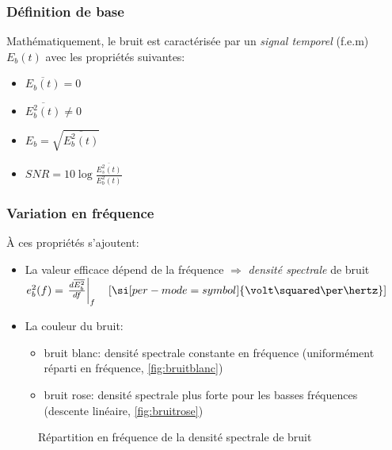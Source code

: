 \subsubsection{Définition de base}
Mathématiquement, le bruit est caractérisée par un \emph{signal temporel} (f.e.m) $E_b(t)$ avec les propriétés suivantes:
\begin{itemize}
	\item { $\overline{E_b(t)}=0$}
	\item { $\overline{E_b^2(t)} \neq 0$}
	\item { $E_b=\sqrt{\overline{E_b^2(t)}}$}
	\item { $SNR=10\log\frac{\overline{E^2_s(t)}}{E_b^2(t)}$}
\end{itemize}
\subsubsection{Variation en fréquence}
À ces propriétés s'ajoutent:\begin{itemize}
	\item La valeur efficace dépend de la fréquence $\Rightarrow$ \emph{densité spectrale} de bruit $e_b^2(f)=\left.\frac{d\overline{E_b^2}}{df}\right|_f\quad [\si[per-mode=symbol]{\volt\squared\per\hertz}]$
	\item La couleur du bruit:
	\begin{itemize}
		\item bruit blanc: densité spectrale constante en fréquence (uniformément réparti en fréquence, \autoref{fig:bruitblanc})
		\item bruit rose: densité spectrale plus forte pour les basses fréquences (descente linéaire, \autoref{fig:bruitrose})
	\end{itemize}
\end{itemize}
\begin{figure}[H]
	\centering
	\caption{Répartition en fréquence de la densité spectrale de bruit}
\end{figure}
